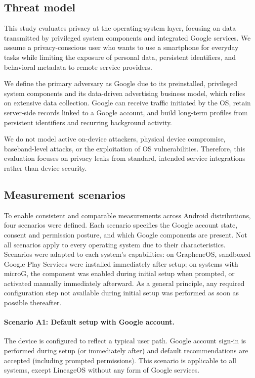 \subsection{Threat model}

This study evaluates privacy at the operating-system layer, focusing on data transmitted by privileged system components and integrated Google services. We assume a privacy-conscious user who wants to use a smartphone for everyday tasks while limiting the exposure of personal data, persistent identifiers, and behavioral metadata to remote service providers.

We define the primary adversary as Google due to its preinstalled, privileged system components and its data-driven advertising business model, which relies on extensive data collection. Google can receive traffic initiated by the OS, retain server-side records linked to a Google account, and build long-term profiles from persistent identifiers and recurring background activity.

We do not model active on-device attackers, physical device compromise, baseband-level attacks, or the exploitation of OS vulnerabilities. Therefore, this evaluation focuses on privacy leaks from standard, intended service integrations rather than device security.

\subsection{Measurement scenarios}
To enable consistent and comparable measurements across Android distributions, four scenarios were defined. Each scenario specifies the Google account state, consent and permission posture, and which Google components are present. Not all scenarios apply to every operating system due to their characteristics. Scenarios were adapted to each system's capabilities: on GrapheneOS, sandboxed Google Play Services were installed immediately after setup; on systems with microG, the component was enabled during initial setup when prompted, or activated manually immediately afterward. As a general principle, any required configuration step not available during initial setup was performed as soon as possible thereafter.

\paragraph{Scenario A1: Default setup with Google account.}
The device is configured to reflect a typical user path. Google account sign-in is performed during setup (or immediately after) and default recommendations are accepted (including prompted permissions). This scenario is applicable to all systems, except LineageOS without any form of Google services.

